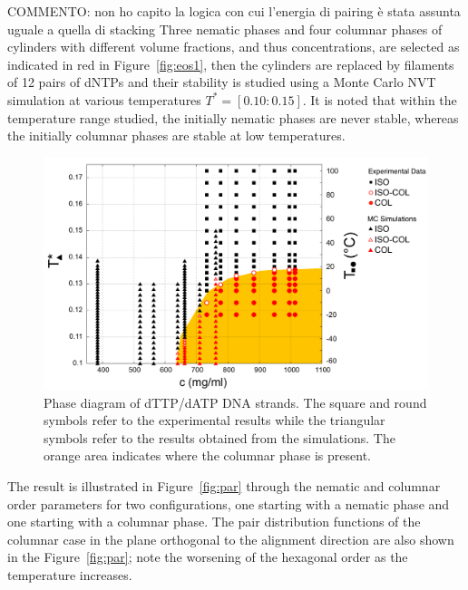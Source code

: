 \documentclass[aip,jcp, amsmath, amssymb, reprint]{revtex4-1}
\begin{document}
{\color{red} COMMENTO: non ho capito la logica con cui l'energia di pairing è stata assunta
uguale a quella di stacking}
Three nematic phases and four columnar phases of cylinders with different volume fractions, and thus concentrations,
are selected as indicated in red in Figure~\ref{fig:eos1}, then the cylinders are replaced by filaments of 12 pairs of
dNTPs and their stability is studied using a Monte Carlo NVT simulation at various temperatures $T^*=[0.10:0.15]$. It
is noted that within the temperature range studied, the initially nematic phases are never stable, whereas the
initially columnar phases are stable at low temperatures. 
\begin{figure}[t!] \includegraphics[width=0.7\linewidth]{finaleeng.png} \caption{\label{fig:wide}Phase diagram of
    dTTP/dATP DNA strands. The square and round symbols refer to the experimental results while the triangular symbols
  refer to the results obtained from the simulations. The orange area indicates where the columnar phase is present.}
\end{figure}

 The result is illustrated in Figure~\ref{fig:par} through the nematic and columnar order parameters for two
 configurations, one starting with a nematic phase and one starting with a columnar phase. The pair distribution
 functions of the columnar case in the plane orthogonal to the alignment direction are also shown in the Figure~\ref{fig:par}; note the worsening of the hexagonal order as the temperature increases.
\end{document}
